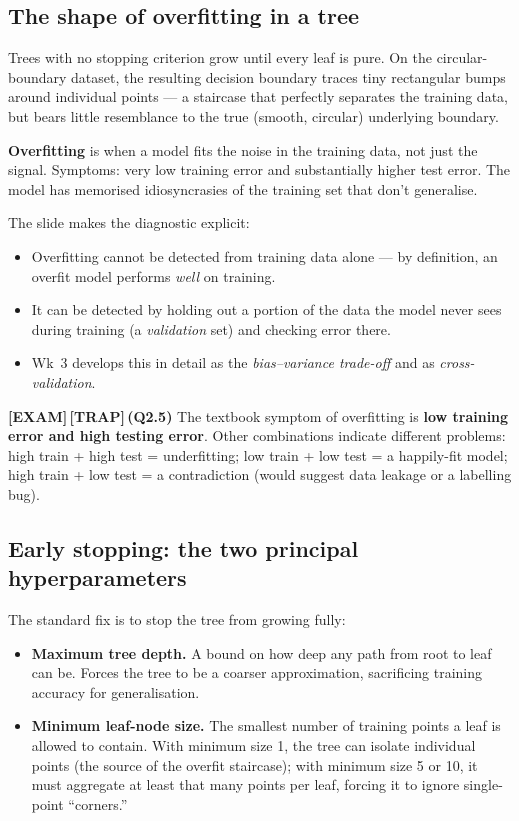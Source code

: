 \documentclass[11pt, a4paper]{article}
\newcommand{\examflag}{\textcolor{tipBd}{\textbf{[EXAM]}}\,}
\newcommand{\trapflag}{\textcolor{trapBd}{\textbf{[TRAP]}}\,}
\begin{document}
\subsection{The shape of overfitting in a tree}

Trees with no stopping criterion grow until every leaf is pure. On the circular-boundary dataset, the resulting decision boundary traces tiny rectangular bumps around individual points — a staircase that perfectly separates the training data, but bears little resemblance to the true (smooth, circular) underlying boundary.

\begin{defbox}[Overfitting]
\textbf{Overfitting} is when a model fits the noise in the training data, not just the signal. Symptoms: very low training error and substantially higher test error. The model has memorised idiosyncrasies of the training set that don't generalise.
\end{defbox}

The slide makes the diagnostic explicit:

\begin{itemize}
  \item Overfitting cannot be detected from training data alone — by definition, an overfit model performs \emph{well} on training.
  \item It can be detected by holding out a portion of the data the model never sees during training (a \emph{validation} set) and checking error there.
  \item Wk~3 develops this in detail as the \emph{bias--variance trade-off} and as \emph{cross-validation}.
\end{itemize}

\examflag{}\trapflag{}\textbf{(Q2.5)} The textbook symptom of overfitting is \textbf{low training error and high testing error}. Other combinations indicate different problems: high train + high test = underfitting; low train + low test = a happily-fit model; high train + low test = a contradiction (would suggest data leakage or a labelling bug).

\subsection{Early stopping: the two principal hyperparameters}

The standard fix is to stop the tree from growing fully:

\begin{itemize}
  \item \textbf{Maximum tree depth.} A bound on how deep any path from root to leaf can be. Forces the tree to be a coarser approximation, sacrificing training accuracy for generalisation.
  \item \textbf{Minimum leaf-node size.} The smallest number of training points a leaf is allowed to contain. With minimum size 1, the tree can isolate individual points (the source of the overfit staircase); with minimum size 5 or 10, it must aggregate at least that many points per leaf, forcing it to ignore single-point ``corners.''
\end{itemize}
\end{document}
